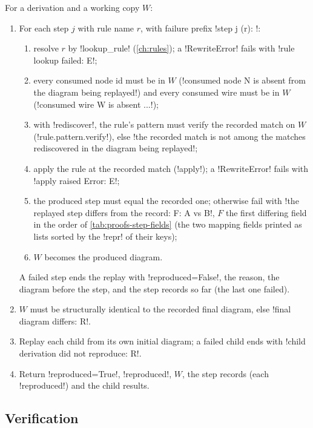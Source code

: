 \begin{algorithm}[Replay]\label{alg:proofs-replay}
For a derivation and a working copy $W$:
\begin{enumerate}
\item For each step $j$ with rule name $r$, with failure prefix \code!step j (r): !:
  \begin{enumerate}
  \item resolve $r$ by \py!lookup_rule! (\cref{ch:rules}); a \py!RewriteError! fails with \code!rule lookup failed: E!;
  \item every consumed node id must be in $W$ (\code!consumed node N is absent from the diagram being replayed!) and every consumed wire must be in $W$ (\code!consumed wire W is absent ...!);
  \item with \py!rediscover!, the rule's pattern must verify the recorded match on $W$ (\py!rule.pattern.verify!), else \code!the recorded match is not among the matches rediscovered in the diagram being replayed!;
  \item apply the rule at the recorded match (\py!apply!); a \py!RewriteError! fails with \code!apply raised Error: E!;
  \item the produced step must equal the recorded one; otherwise fail with \code!the replayed step differs from the record: F: A vs B!, $F$ the first differing field in the order of \cref{tab:proofs-step-fields} (the two mapping fields printed as lists sorted by the \py!repr! of their keys);
  \item $W$ becomes the produced diagram.
  \end{enumerate}
  A failed step ends the replay with \py!reproduced=False!, the reason, the diagram before the step, and the step records so far (the last one failed).
\item $W$ must be structurally identical to the recorded final diagram, else \code!final diagram differs: R!.
\item Replay each child from its own initial diagram; a failed child ends with \code!child derivation did not reproduce: R!.
\item Return \py!reproduced=True!, \code!reproduced!, $W$, the step records (each \code!reproduced!) and the child results.
\end{enumerate}
\end{algorithm}

\subsection{Verification}

